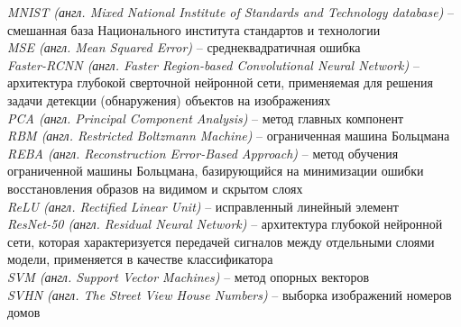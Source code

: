 \textit{MNIST (англ. Mixed National Institute of Standards and Technology database)} -- смешанная база Национального института стандартов и технологии\\
\textit{MSE (англ. Mean Squared Error)} -- среднеквадратичная ошибка\\
\textit{Faster-RCNN (англ. Faster Region-based Convolutional Neural Network)} -- архитектура глубокой сверточной нейронной сети, применяемая для решения задачи детекции (обнаружения) объектов на изображениях\\
\textit{PCA (англ. Principal Component Analysis)} -- метод главных компонент\\
\textit{RBM (англ. Restricted Boltzmann Machine)} -- ограниченная машина Больцмана\\
\textit{REBA (англ. Reconstruction Error-Based Approach)} -- метод обучения ограниченной машины Больцмана, базирующийся на минимизации ошибки восстановления образов на видимом и скрытом слоях\\
\textit{ReLU (англ. Rectified Linear Unit)} -- исправленный линейный элемент\\
\textit{ResNet-50 (англ. Residual Neural Network)} -- архитектура глубокой нейронной сети, которая характеризуется передачей сигналов между отдельными слоями модели, применяется в качестве классификатора\\
\textit{SVM (англ. Support Vector Machines)} -- метод опорных векторов\\
\textit{SVHN (англ. The Street View House Numbers)} -- выборка изображений номеров домов






